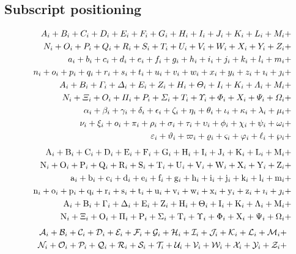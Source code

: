 \documentclass{article}
\def\test#1{#1}
\def\testupperi{%
  \test A \test B \test C \test D \test E \test F \test G \test H
  \test I \test J \test K \test L \test M }
\def\testupperii{%
  \test N \test O \test P \test Q \test R \test S \test T \test U
  \test V \test W \test X \test Y \test Z }
\def\testloweri{%
  \test a \test b \test c \test d \test e \test f \test g \test h
  \test i \test j \test k \test l \test m }
\def\testlowerii{%
  \test n \test o \test p \test q \test r \test s \test t \test u
  \test v \test w \test x \test y \test z 
  \test\imath \test\jmath }
\def\testupgreeki{%
  \test A \test B \test\Gamma \test\Delta \test E \test Z \test H
  \test\Theta \test I \test K \test\Lambda \test M }
\def\testupgreekii{%
  \test N \test\Xi \test O \test\Pi \test P \test\Sigma \test T
  \test\Upsilon \test\Phi \test X \test\Psi \test\Omega 
}
\def\testlowgreeki{%
  \test\alpha \test\beta \test\gamma \test\delta \test\epsilon
  \test\zeta \test\eta \test\theta \test\iota \test\kappa \test\lambda
  \test\mu }
\def\testlowgreekii{%
  \test\nu \test\xi \test o \test\pi \test\rho \test\sigma \test\tau
  \test\upsilon \test\phi \test\chi \test\psi \test\omega }
\def\testlowgreekiii{%
  \test\varepsilon \test\vartheta \test\varpi \test\varrho
  \test\varsigma \test\varphi \test\ell \test\wp}
\begin{document}
\clearpage
\subsection{Subscript positioning}

\def\test#1{\mathnormal{#1}_{i}+}%
\begin{eqnarray*}
  && {\testupperi}\\
  && {\testupperii}\\
  && {\testloweri}\\ 
  && {\testlowerii}\\ 
  && {\testupgreeki}\\
  && {\testupgreekii}\\
  && {\testlowgreeki}\\
  && {\testlowgreekii}\\
  && {\testlowgreekiii}
\end{eqnarray*}%
%
\def\test#1{\mathrm{#1}_{i}+}%
\begin{eqnarray*}
  && {\testupperi}\\
  && {\testupperii}\\
  && {\testloweri}\\ 
  && {\testlowerii}\\ 
  && {\testupgreeki}\\
  && {\testupgreekii}
\end{eqnarray*}%
%
%
\def\test#1{\mathcal{#1}_{i}+}%
\begin{eqnarray*}
  && {\testupperi}\\
  && {\testupperii}
\end{eqnarray*}%
\end{document}
